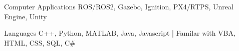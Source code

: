 
\begin{cvskills}
  \cvskill
    {Computer Applications} %
    {ROS/ROS2, Gazebo, Ignition, PX4/RTPS, Unreal Engine, Unity} %

  \cvskill
    {Languages} %
    {C++, Python, MATLAB, Java, Javascript | Familar with VBA, HTML, CSS, SQL, C\#} %
\end{cvskills}
